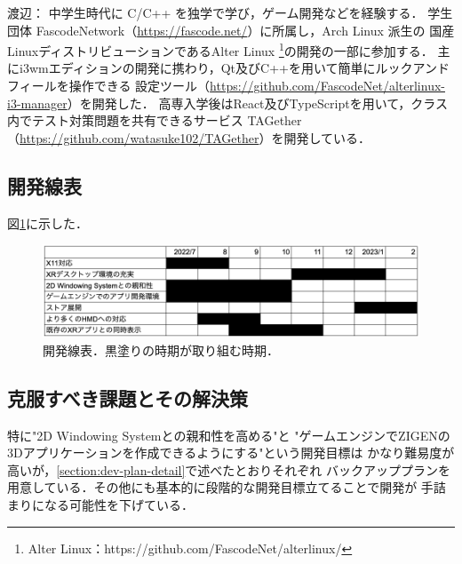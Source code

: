 渡辺：
中学生時代に C/C++ を独学で学び，ゲーム開発などを経験する．
学生団体 FascodeNetwork（\url{https://fascode.net/}）に所属し，Arch Linux 派生の
国産LinuxディストリビューションであるAlter Linux
\footnote{Alter Linux：https://github.com/FascodeNet/alterlinux/}の開発の一部に参加する．
主にi3wmエディションの開発に携わり，Qt及びC++を用いて簡単にルックアンドフィールを操作できる
設定ツール（\url{https://github.com/FascodeNet/alterlinux-i3-manager}）を開発した．
高専入学後はReact及びTypeScriptを用いて，クラス内でテスト対策問題を共有できるサービス
TAGether（\url{https://github.com/watasuke102/TAGether}）を開発している．

\subsection{開発線表}

図\ref{fig:dev-schedule}に示した．

\begin{figure}[htbp]
      \centering
      \includegraphics[keepaspectratio, width=\linewidth]{fig/dev-schedule.png}
      \caption{開発線表．黒塗りの時期が取り組む時期．}
      \label{fig:dev-schedule}
\end{figure}

\subsection{克服すべき課題とその解決策}

特に"2D Windowing Systemとの親和性を高める"と
"ゲームエンジンでZIGENの3Dアプリケーションを作成できるようにする"という開発目標は
かなり難易度が高いが，\ref{section:dev-plan-detail}で述べたとおりそれぞれ
バックアッププランを用意している．その他にも基本的に段階的な開発目標立てることで開発が
手詰まりになる可能性を下げている．

